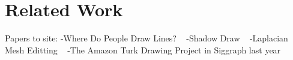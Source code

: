 \section{Related Work}

Papers to site:
-Where Do People Draw Lines? ~\cite{Cole:2008}
-Shadow Draw ~\cite{Lee:2011}
-Laplacian Mesh Editting ~\cite{Sorkine:2004}
-The Amazon Turk Drawing Project in Siggraph last year 


